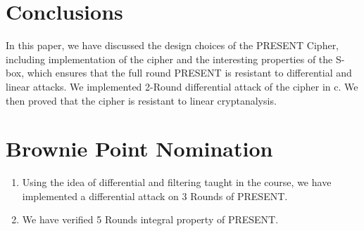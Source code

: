 \documentclass[journal=tosc,preprint]{iacrtrans}
\begin{document}
\section{Conclusions}
In this paper, we have discussed the design choices of the PRESENT Cipher, including implementation of the cipher and the interesting properties of the S-box, which ensures that the full round PRESENT is resistant to differential and linear attacks. We implemented 2-Round differential attack of the cipher in c. We then proved that the cipher is resistant to linear cryptanalysis.
\section{Brownie Point Nomination}
\begin{enumerate}
	\item Using the idea of differential and filtering taught in the course, we have implemented a differential attack on 3 Rounds of PRESENT. 
	\item We have verified 5 Rounds integral property of PRESENT.
\end{enumerate}
%
%
\end{document}
